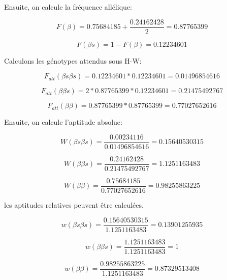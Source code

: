 \documentclass{article}
\begin{document}
Ensuite, on calcule la fréquence allélique:

\begin{equation}
F(\beta) = 0.75684185 + \frac{0.24162428}{2} = 0.87765399
\end{equation}

\begin{equation}
F(\beta s) = 1 - F(\beta) = 0.12234601
\end{equation}

Calculons les génotypes attendus sous H-W:

\begin{equation}
F_{att}(\beta s \beta s) = 0.12234601 * 0.12234601 = 0.01496854616
\end{equation}

\begin{equation}
F_{att}(\beta\beta s) = 2 * 0.87765399 * 0.12234601 = 0.21475492767
\end{equation} 

\begin{equation}
F_{att}(\beta\beta) = 0.87765399 * 0.87765399 =  0.77027652616
\end{equation}

Ensuite, on calcule l'aptitude absolue:

\begin{equation}
W(\beta s \beta s) = \frac{0.00234116}{0.01496854616} = 0.15640530315
\end{equation}

\begin{equation}
W(\beta\beta s) = \frac{0.24162428}{0.21475492767} = 1.1251163483
\end{equation}

\begin{equation}
W(\beta\beta) = \frac{0.75684185}{0.77027652616} = 0.98255863225
\end{equation}

les aptitudes relatives peuvent être calculées.

\begin{equation}
w(\beta s \beta s) = \frac{0.15640530315}{1.1251163483} = 0.13901255935
\end{equation}

\begin{equation}
w(\beta\beta s) = \frac{1.1251163483}{1.1251163483} = 1
\end{equation}

\begin{equation}
w(\beta\beta) = \frac{0.98255863225}{1.1251163483} = 0.87329513408
\end{equation}
\end{document}

